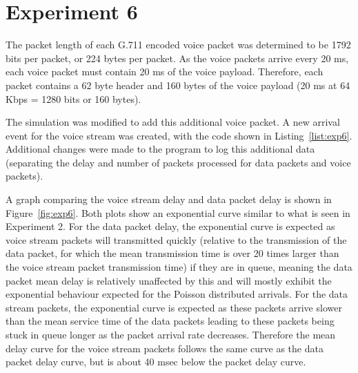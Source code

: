 \section*{Experiment 6}
The packet length of each G.711 encoded voice packet was determined to be 1792 bits per packet, or 224 bytes per packet. As the voice packets arrive every 20 ms, each voice packet must contain 20 ms of the voice payload. Therefore, each packet contains a 62 byte header and 160 bytes of the voice payload (20 ms at 64 Kbps = 1280 bits or 160 bytes).

The simulation was modified to add this additional voice packet. A new arrival event for the voice stream was created, with the code shown in Listing~\ref{list:exp6}. Additional changes were made to the program to log this additional data (separating the delay and number of packets processed for data packets and voice packets).

A graph comparing the voice stream delay and data packet delay is shown in Figure~\ref{fig:exp6}. Both plots show an exponential curve similar to what is seen in Experiment 2. For the data packet delay, the exponential curve is expected as voice stream packets will transmitted quickly (relative to the transmission of the data packet, for which the mean transmission time is over 20 times larger than the voice stream packet transmission time) if they are in queue, meaning the data packet mean delay is relatively unaffected by this and will mostly exhibit the exponential behaviour expected for the Poisson distributed arrivals. For the data stream packets, the exponential curve is expected as these packets arrive slower than the mean service time of the data packets leading to these packets being stuck in queue longer as the packet arrival rate decreases. Therefore the mean delay curve for the voice stream packets follows the same curve as the data packet delay curve, but is about 40 msec below the packet delay curve.

